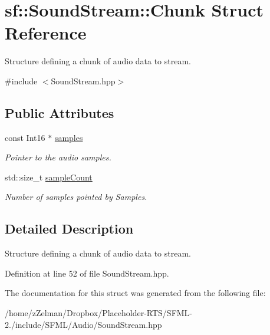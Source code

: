 \hypertarget{structsf_1_1SoundStream_1_1Chunk}{\section{sf\-:\-:Sound\-Stream\-:\-:Chunk Struct Reference}
\label{structsf_1_1SoundStream_1_1Chunk}
}


Structure defining a chunk of audio data to stream.  




{\ttfamily \#include $<$Sound\-Stream.\-hpp$>$}

\subsection*{Public Attributes}
\begin{DoxyCompactItemize}
\item 
\hypertarget{structsf_1_1SoundStream_1_1Chunk_aa3b84d69adbe663a17a7671626076df4}{const Int16 $\ast$ \hyperlink{structsf_1_1SoundStream_1_1Chunk_aa3b84d69adbe663a17a7671626076df4}{samples}}\label{structsf_1_1SoundStream_1_1Chunk_aa3b84d69adbe663a17a7671626076df4}

\begin{DoxyCompactList}\small\item\em Pointer to the audio samples. \end{DoxyCompactList}\item 
\hypertarget{structsf_1_1SoundStream_1_1Chunk_af47f5d94012acf8b11f056ba77aff97a}{std\-::size\-\_\-t \hyperlink{structsf_1_1SoundStream_1_1Chunk_af47f5d94012acf8b11f056ba77aff97a}{sample\-Count}}\label{structsf_1_1SoundStream_1_1Chunk_af47f5d94012acf8b11f056ba77aff97a}

\begin{DoxyCompactList}\small\item\em Number of samples pointed by Samples. \end{DoxyCompactList}\end{DoxyCompactItemize}


\subsection{Detailed Description}
Structure defining a chunk of audio data to stream. 

Definition at line 52 of file Sound\-Stream.\-hpp.



The documentation for this struct was generated from the following file\-:\begin{DoxyCompactItemize}
\item 
/home/z\-Zelman/\-Dropbox/\-Placeholder-\/\-R\-T\-S/\-S\-F\-M\-L-\/2./include/\-S\-F\-M\-L/\-Audio/Sound\-Stream.\-hpp\end{DoxyCompactItemize}
